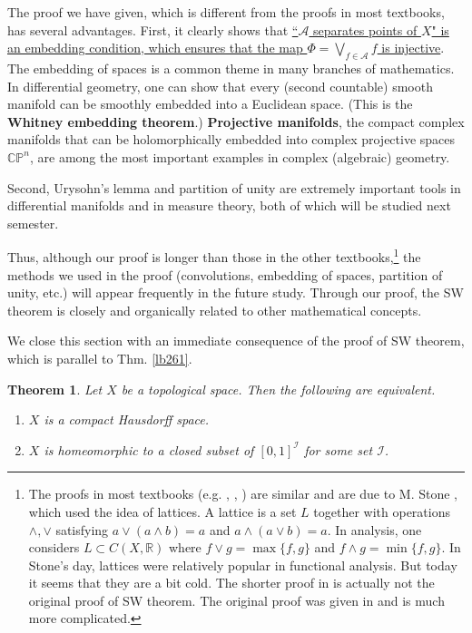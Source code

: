 \documentclass[12pt,b5paper,notitlepage]{article}
\theoremstyle{definition}
\theoremstyle{plain}
\newtheorem{thm}[df]{Theorem}
\newcommand{\scr}{\mathscr}
\newcommand{\Cbb}{\mathbb C}
\newcommand{\Pbb}{\mathbb P}
\newcommand{\Rbb}{\mathbb R}
\numberwithin{equation}{section}
\begin{document}
The proof we have given, which is different from the proofs in most textbooks, has several advantages. First, it clearly shows that \uline{``$\scr A$ separates points of $X$" is an embedding condition, which ensures that the map $\Phi=\bigvee_{f\in\scr A}f$ is injective}. The embedding of spaces is a common theme in many branches of mathematics. In differential geometry, one can show that every (second countable) smooth manifold can be smoothly embedded into a Euclidean space. (This is the \textbf{Whitney embedding theorem}.) \textbf{Projective manifolds}, the
compact complex manifolds that can be holomorphically embedded into complex projective spaces $\Cbb\Pbb^n$, are among the most important examples in complex (algebraic) geometry.

Second, Urysohn's lemma and partition of unity are extremely important tools in differential manifolds and in measure theory, both of which will be studied next semester.  

Thus, although our proof is longer than those in the other textbooks,\footnote{The proofs in most textbooks (e.g. \cite[Sec. 4.7]{Fol}, \cite[Ch. 7]{Rud-P}, \cite[Sec. 16.4]{Zor-2}) are similar and are due to M. Stone \cite{Sto48}, which used the idea of lattices. A lattice is a set $L$ together with operations $\wedge,\vee$ satisfying $a \vee(a \wedge b)=a$ and $a \wedge(a \vee b)=a$. In analysis, one considers $L\subset C(X,\Rbb)$ where $f\vee g=\max\{f,g\}$ and $f\wedge g=\min\{f,g\}$. In Stone's day, lattices were relatively popular in functional analysis. But today it seems that they are a bit cold. The shorter proof in \cite{Sto48} is actually not the original proof of SW theorem. The original proof was given in \cite{Sto37} and is much more complicated.} the methods we used in the proof (convolutions, embedding of spaces, partition of unity, etc.) will appear frequently in the future study. Through our proof, the SW theorem is closely and organically related to other mathematical concepts.  



We close this section with an immediate consequence of the proof of SW theorem, which is parallel to Thm. \ref{lb261}.

\begin{thm}
Let $X$ be a topological space. Then the following are equivalent.
\begin{enumerate}[label=(\arabic*)]
\item $X$ is a compact Hausdorff space.
\item $X$ is homeomorphic to a closed subset of $[0,1]^{\scr I}$ for some set $\scr I$.
\end{enumerate}
\end{thm}
\end{document}
